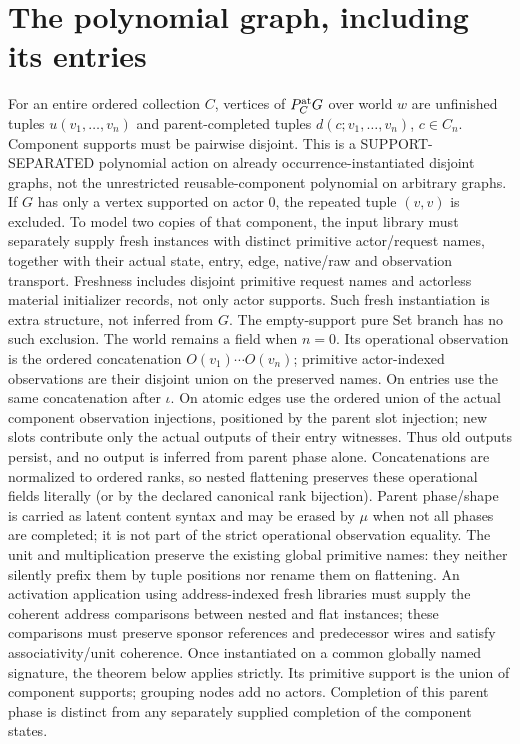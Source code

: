 \documentclass[11pt]{article}
\begin{document}
\section{The polynomial graph, including its entries}
For an entire ordered collection $C$, vertices of $P_C^{\rm at}G$ over world $w$ are unfinished tuples $u(v_1,\ldots,v_n)$ and parent-completed tuples $d(c;v_1,\ldots,v_n)$, $c\in C_n$. Component supports must be pairwise disjoint. This is a SUPPORT-SEPARATED polynomial action on already occurrence-instantiated disjoint graphs, not the unrestricted reusable-component polynomial on arbitrary graphs. If $G$ has only a vertex supported on actor $0$, the repeated tuple $(v,v)$ is excluded. To model two copies of that component, the input library must separately supply fresh instances with distinct primitive actor/request names, together with their actual state, entry, edge, native/raw and observation transport. Freshness includes disjoint primitive request names and actorless material initializer records, not only actor supports. Such fresh instantiation is extra structure, not inferred from $G$. The empty-support pure Set branch has no such exclusion. The world remains a field when $n=0$. Its operational observation is the ordered concatenation $O(v_1)\cdots O(v_n)$; primitive actor-indexed observations are their disjoint union on the preserved names. On entries use the same concatenation after $\iota$. On atomic edges use the ordered union of the actual component observation injections, positioned by the parent slot injection; new slots contribute only the actual outputs of their entry witnesses. Thus old outputs persist, and no output is inferred from parent phase alone. Concatenations are normalized to ordered ranks, so nested flattening preserves these operational fields literally (or by the declared canonical rank bijection). Parent phase/shape is carried as latent content syntax and may be erased by $\mu$ when not all phases are completed; it is not part of the strict operational observation equality. The unit and multiplication preserve the existing global primitive names: they neither silently prefix them by tuple positions nor rename them on flattening. An activation application using address-indexed fresh libraries must supply the coherent address comparisons between nested and flat instances; these comparisons must preserve sponsor references and predecessor wires and satisfy associativity/unit coherence. Once instantiated on a common globally named signature, the theorem below applies strictly. Its primitive support is the union of component supports; grouping nodes add no actors. Completion of this parent phase is distinct from any separately supplied completion of the component states.
\end{document}
